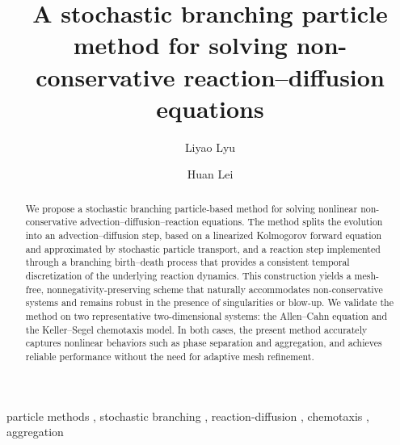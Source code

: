 \documentclass[a4paper,fleqn]{cas-sc}
\theoremstyle{definition}
\theoremstyle{remark}
\begin{document}
\let\WriteBookmarks\relax
\def\floatpagepagefraction{1}
\def\textpagefraction{.001}


\title[mode=title]{A stochastic branching particle method for solving non-conservative reaction--diffusion equations}

\author[1,2]{Liyao Lyu}

\author[2,3]{Huan Lei}




\begin{abstract}
We propose a stochastic branching particle-based method for solving nonlinear non-conservative advection–diffusion–reaction equations. 
The method splits the evolution into an advection–diffusion step, based on a linearized Kolmogorov forward equation and approximated by stochastic particle transport, and a reaction step implemented through a branching birth–death process that provides a consistent temporal discretization of the underlying reaction dynamics. This construction yields a mesh-free, nonnegativity-preserving scheme that naturally accommodates non-conservative systems and remains robust in the presence of singularities or blow-up. 
We validate the method on two representative two-dimensional systems: the Allen–Cahn equation and the Keller–Segel chemotaxis model. In both cases, the present method accurately captures nonlinear behaviors such as phase separation and aggregation, and achieves reliable performance without the need for adaptive mesh refinement.

\end{abstract}

\begin{keywords}
particle methods \sep
stochastic branching \sep
reaction-diffusion \sep
chemotaxis \sep
aggregation
\end{keywords}
\end{document}
